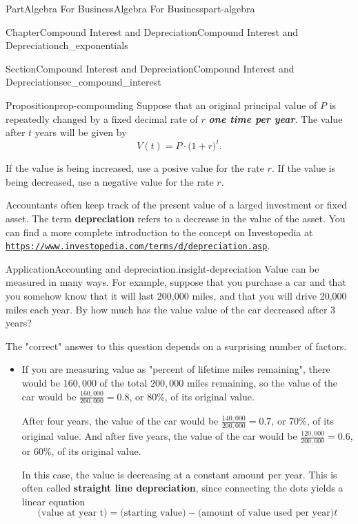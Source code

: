 \documentclass[oneside,10pt,]{tufte-book}
\newcommand{\alert}[1]{\textbf{\textit{#1}}}
\newcommand{\terminology}[1]{\textbf{#1}}
\numberwithin{equation}{chapter}
\begin{document}
\begin{partptx}{Part}{Algebra For Business}{}{Algebra For Business}{}{}{part-algebra}
\begin{chapterptx}{Chapter}{Compound Interest and Depreciation}{}{Compound Interest and Depreciation}{}{}{ch_exponentials}
\begin{sectionptx}{Section}{Compound Interest and Depreciation}{}{Compound Interest and Depreciation}{}{}{sec_compound_interest}
\begin{proposition}{Proposition}{}{}{prop-compounding}%
Suppose that an original principal value of \(P\) is repeatedly changed by a fixed decimal rate of \(r\) \alert{one time per year}.  The value after \(t\) years will be given by%
\begin{equation*}
V(t) = P \cdot \Big( 1 + r \Big)^t\text{.}
\end{equation*}
%
\par
If the value is being increased, use a posive value for the rate \(r\).  If the value is being decreased, use a negative value for the rate \(r\).%
\end{proposition}
Accountants often keep track of the present value of a larged investment or fixed asset. The term \terminology{depreciation} refers to a decrease in the value of the asset. You can find a more complete introduction to the concept on Investopedia at \href{https://www.investopedia.com/terms/d/depreciation.asp}{\nolinkurl{https://www.investopedia.com/terms/d/depreciation.asp}}.%
\begin{insight}{Application}{Accounting and depreciation.}{insight-depreciation}%
Value can be measured in many ways. For example, suppose that you purchase a car and that you somehow know that it will last 200,000 miles, and that you will drive 20,000 miles each year. By how much has the value value of the car decreased after 3 years?%
\par
The "correct" answer to this question depends on a surprising number of factors.%
\begin{itemize}[label=\textbullet]
\item{}If you are measuring value as "percent of lifetime miles remaining", there would be \(160,000\) of the total \(200,000\) miles remaining, so the value of the car would be \(\frac{160,000}{200,000} = 0.8\), or 80\%, of its original value.%
\par
After four years, the value of the car would be  \(\frac{140,000}{200,000} = 0.7\), or 70\%, of its original value. And after five years, the value of the car would be  \(\frac{120,000}{200,000} = 0.6\), or 60\%, of its original value.%
\par
In this case, the value is decreasing at a constant amount per year.  This is often called \terminology{straight line depreciation}, since connecting the dots yields a linear equation%
\begin{equation*}
\text{(value at year t)} = \text{(starting value)} - \text{(amount of value used per year)} t
\end{equation*}

\end{itemize}
\end{insight}
\end{sectionptx}
\end{chapterptx}
\end{partptx}
\end{document}

